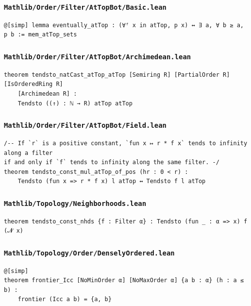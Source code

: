 \subsubsection{\texttt{Mathlib/Order/Filter/AtTopBot/Basic.lean}}
\begin{lstlisting}[language=lean]
@[simp] lemma eventually_atTop : (∀ᶠ x in atTop, p x) ↔ ∃ a, ∀ b ≥ a, p b := mem_atTop_sets
\end{lstlisting}

\subsubsection{\texttt{Mathlib/Order/Filter/AtTopBot/Archimedean.lean}}
\begin{lstlisting}[language=lean]
theorem tendsto_natCast_atTop_atTop [Semiring R] [PartialOrder R] [IsOrderedRing R]
    [Archimedean R] :
    Tendsto ((↑) : ℕ → R) atTop atTop
\end{lstlisting}

\subsubsection{\texttt{Mathlib/Order/Filter/AtTopBot/Field.lean}}
\begin{lstlisting}[language=lean]
/-- If `r` is a positive constant, `fun x ↦ r * f x` tends to infinity along a filter
if and only if `f` tends to infinity along the same filter. -/
theorem tendsto_const_mul_atTop_of_pos (hr : 0 < r) :
    Tendsto (fun x => r * f x) l atTop ↔ Tendsto f l atTop
\end{lstlisting}

\subsubsection{\texttt{Mathlib/Topology/Neighborhoods.lean}}
\begin{lstlisting}[language=lean]
theorem tendsto_const_nhds {f : Filter α} : Tendsto (fun _ : α => x) f (𝓝 x)
\end{lstlisting}

\subsubsection{\texttt{Mathlib/Topology/Order/DenselyOrdered.lean}}
\begin{lstlisting}[language=lean]
@[simp]
theorem frontier_Icc [NoMinOrder α] [NoMaxOrder α] {a b : α} (h : a ≤ b) :
    frontier (Icc a b) = {a, b}
\end{lstlisting}


